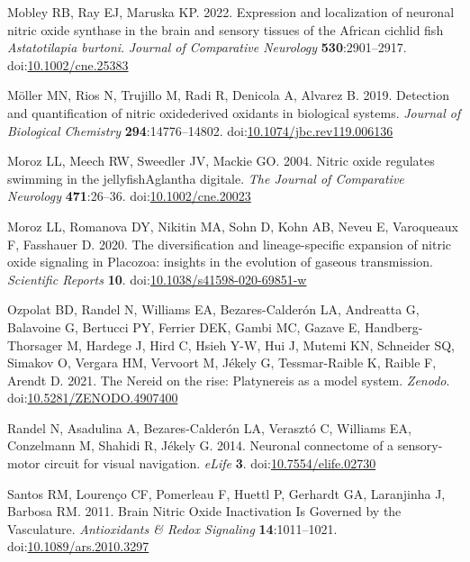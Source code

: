 \documentclass[
  10pt,
  onecolumn]{article}
\newlength{\cslhangindent}
\newlength{\cslentryspacingunit} %
\newenvironment{CSLReferences}[2] %
 {%
  \setlength{\parindent}{0pt}
  \ifodd #1
  \let\oldpar\par
  \def\par{\hangindent=\cslhangindent\oldpar}
  \fi
  \setlength{\parskip}{#2\cslentryspacingunit}
 }%
 {}
\begin{document}
\begin{CSLReferences}{1}{0}
\leavevmode{}%
Mobley RB, Ray EJ, Maruska KP. 2022. Expression and localization of
neuronal nitric oxide synthase in the brain and sensory tissues of the
African cichlid fish {\emph{Astatotilapia burtoni}}. \emph{Journal of
Comparative Neurology} \textbf{530}:2901--2917.
doi:\href{https://doi.org/10.1002/cne.25383}{10.1002/cne.25383}

\leavevmode{}%
Möller MN, Rios N, Trujillo M, Radi R, Denicola A, Alvarez B. 2019.
Detection and quantification of nitric oxide{\textendash}derived
oxidants in biological systems. \emph{Journal of Biological Chemistry}
\textbf{294}:14776--14802.
doi:\href{https://doi.org/10.1074/jbc.rev119.006136}{10.1074/jbc.rev119.006136}

\leavevmode{}%
Moroz LL, Meech RW, Sweedler JV, Mackie GO. 2004. Nitric oxide regulates
swimming in the jellyfishAglantha digitale. \emph{The Journal of
Comparative Neurology} \textbf{471}:26--36.
doi:\href{https://doi.org/10.1002/cne.20023}{10.1002/cne.20023}

\leavevmode{}%
Moroz LL, Romanova DY, Nikitin MA, Sohn D, Kohn AB, Neveu E, Varoqueaux
F, Fasshauer D. 2020. The diversification and lineage-specific expansion
of nitric oxide signaling in Placozoa: insights in the evolution of
gaseous transmission. \emph{Scientific Reports} \textbf{10}.
doi:\href{https://doi.org/10.1038/s41598-020-69851-w}{10.1038/s41598-020-69851-w}

\leavevmode{}%
Ozpolat BD, Randel N, Williams EA, Bezares-Calderón LA, Andreatta G,
Balavoine G, Bertucci PY, Ferrier DEK, Gambi MC, Gazave E,
Handberg-Thorsager M, Hardege J, Hird C, Hsieh Y-W, Hui J, Mutemi KN,
Schneider SQ, Simakov O, Vergara HM, Vervoort M, Jékely G,
Tessmar-Raible K, Raible F, Arendt D. 2021. The Nereid on the rise:
Platynereis as a model system. \emph{Zenodo}.
doi:\href{https://doi.org/10.5281/ZENODO.4907400}{10.5281/ZENODO.4907400}

\leavevmode{}%
Randel N, Asadulina A, Bezares-Calderón LA, Verasztó C, Williams EA,
Conzelmann M, Shahidi R, Jékely G. 2014. Neuronal connectome of a
sensory-motor circuit for visual navigation. \emph{eLife} \textbf{3}.
doi:\href{https://doi.org/10.7554/elife.02730}{10.7554/elife.02730}

\leavevmode{}%
Santos RM, Lourenço CF, Pomerleau F, Huettl P, Gerhardt GA, Laranjinha
J, Barbosa RM. 2011. Brain Nitric Oxide Inactivation Is Governed by the
Vasculature. \emph{Antioxidants \& Redox Signaling}
\textbf{14}:1011--1021.
doi:\href{https://doi.org/10.1089/ars.2010.3297}{10.1089/ars.2010.3297}


\end{CSLReferences}
\end{document}
